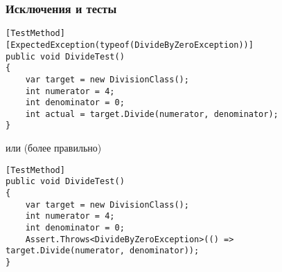 \documentclass{../../slides-style}
\begin{document}
    \begin{frame}[fragile]
        \frametitle{Исключения и тесты}
        \begin{footnotesize}
            \begin{verbatim}
[TestMethod]
[ExpectedException(typeof(DivideByZeroException))]
public void DivideTest()
{
    var target = new DivisionClass();
    int numerator = 4;
    int denominator = 0;
    int actual = target.Divide(numerator, denominator);
}
            \end{verbatim}
        \end{footnotesize}
        или (более правильно)
        \begin{footnotesize}
            \begin{verbatim}
[TestMethod]
public void DivideTest()
{
    var target = new DivisionClass();
    int numerator = 4;
    int denominator = 0;
    Assert.Throws<DivideByZeroException>(() => target.Divide(numerator, denominator));
}
            \end{verbatim}
        \end{footnotesize}
    \end{frame}
\end{document}
